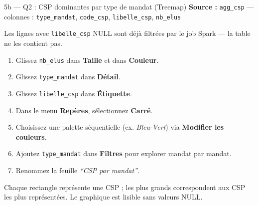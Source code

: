\documentclass[11pt,a4paper]{article}
\begin{document}
\begin{exercice}{5b — Q2 : CSP dominantes par type de mandat (Treemap)}
\textbf{Source :} \texttt{agg\_csp} — colonnes : \texttt{type\_mandat}, \texttt{code\_csp}, \texttt{libelle\_csp}, \texttt{nb\_elus}

\begin{hint}
Les lignes avec \texttt{libelle\_csp} NULL sont déjà filtrées par le job Spark — la table ne les contient pas.
\end{hint}

\begin{enumerate}[leftmargin=*]
  \item Glissez \texttt{nb\_elus} dans \textbf{Taille} et dans \textbf{Couleur}.
  \item Glissez \texttt{type\_mandat} dans \textbf{Détail}.
  \item Glissez \texttt{libelle\_csp} dans \textbf{Étiquette}.
  \item Dans le menu \textbf{Repères}, sélectionnez \textbf{Carré}.
  \item Choisissez une palette séquentielle (ex. \textit{Bleu-Vert}) via \textbf{Modifier les couleurs}.
  \item Ajoutez \texttt{type\_mandat} dans \textbf{Filtres} pour explorer mandat par mandat.
  \item Renommez la feuille \textit{``CSP par mandat''}.
\end{enumerate}

\begin{validation}
Chaque rectangle représente une CSP ; les plus grands correspondent aux CSP les plus représentées. Le graphique est lisible sans valeurs NULL.
\end{validation}
\end{exercice}
\end{document}
